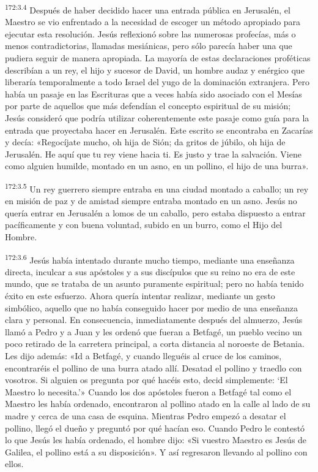 \par 
\textsuperscript{172:3.4} Después de haber decidido hacer una entrada pública en Jerusalén, el Maestro se vio enfrentado a la necesidad de escoger un método apropiado para ejecutar esta resolución. Jesús reflexionó sobre las numerosas profecías, más o menos contradictorias, llamadas mesiánicas, pero sólo parecía haber una que pudiera seguir de manera apropiada. La mayoría de estas declaraciones proféticas describían a un rey, el hijo y sucesor de David, un hombre audaz y enérgico que liberaría temporalmente a todo Israel del yugo de la dominación extranjera. Pero había un pasaje en las Escrituras que a veces había sido asociado con el Mesías por parte de aquellos que más defendían el concepto espiritual de su misión; Jesús consideró que podría utilizar coherentemente este pasaje como guía para la entrada que proyectaba hacer en Jerusalén. Este escrito se encontraba en Zacarías y decía: «Regocíjate mucho, oh hija de Sión; da gritos de júbilo, oh hija de Jerusalén. He aquí que tu rey viene hacia ti. Es justo y trae la salvación. Viene como alguien humilde, montado en un asno, en un pollino, el hijo de una burra».

\par 
\textsuperscript{172:3.5} Un rey guerrero siempre entraba en una ciudad montado a caballo; un rey en misión de paz y de amistad siempre entraba montado en un asno. Jesús no quería entrar en Jerusalén a lomos de un caballo, pero estaba dispuesto a entrar pacíficamente y con buena voluntad, subido en un burro, como el Hijo del Hombre.

\par 
\textsuperscript{172:3.6} Jesús había intentado durante mucho tiempo, mediante una enseñanza directa, inculcar a sus apóstoles y a sus discípulos que su reino no era de este mundo, que se trataba de un asunto puramente espiritual; pero no había tenido éxito en este esfuerzo. Ahora quería intentar realizar, mediante un gesto simbólico, aquello que no había conseguido hacer por medio de una enseñanza clara y personal. En consecuencia, inmediatamente después del almuerzo, Jesús llamó a Pedro y a Juan y les ordenó que fueran a Betfagé, un pueblo vecino un poco retirado de la carretera principal, a corta distancia al noroeste de Betania. Les dijo además: «Id a Betfagé, y cuando lleguéis al cruce de los caminos, encontraréis el pollino de una burra atado allí. Desatad el pollino y traedlo con vosotros. Si alguien os pregunta por qué hacéis esto, decid simplemente: `El Maestro lo necesita.'» Cuando los dos apóstoles fueron a Betfagé tal como el Maestro les había ordenado, encontraron al pollino atado en la calle al lado de su madre y cerca de una casa de esquina. Mientras Pedro empezó a desatar el pollino, llegó el dueño y preguntó por qué hacían eso. Cuando Pedro le contestó lo que Jesús les había ordenado, el hombre dijo: «Si vuestro Maestro es Jesús de Galilea, el pollino está a su disposición». Y así regresaron llevando al pollino con ellos.

